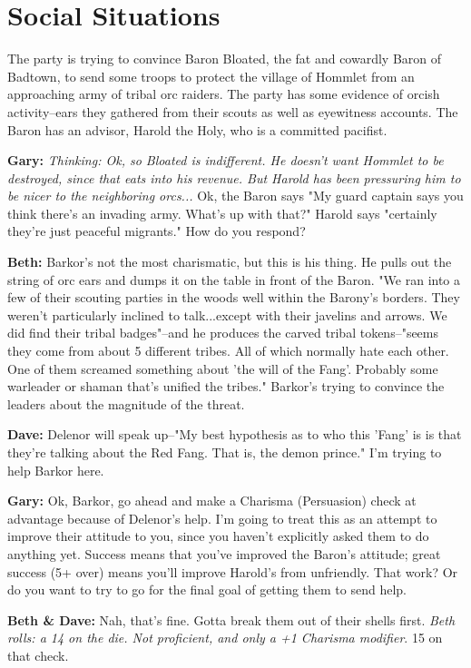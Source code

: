 \section{Social Situations}\label{example:social-situations}
The party is trying to convince Baron Bloated, the fat and cowardly Baron of Badtown, to send some troops to protect the village of Hommlet from an approaching army of tribal orc raiders. The party has some evidence of orcish activity--ears they gathered from their scouts as well as eyewitness accounts. The Baron has an advisor, Harold the Holy, who is a committed pacifist.

\textbf{Gary:} \textit{Thinking: Ok, so Bloated is indifferent. He doesn't want Hommlet to be destroyed, since that eats into his revenue. But Harold has been pressuring him to be nicer to the neighboring orcs...} Ok, the Baron says "My guard captain says you think there's an invading army. What's up with that?" Harold says "certainly they're just peaceful migrants." How do you respond?

\textbf{Beth:} Barkor's not the most charismatic, but this is his thing. He pulls out the string of orc ears and dumps it on the table in front of the Baron. "We ran into a few of their scouting parties in the woods well within the Barony's borders. They weren't particularly inclined to talk...except with their javelins and arrows. We did find their tribal badges"--and he produces the carved tribal tokens--"seems they come from about 5 different tribes. All of which normally hate each other. One of them screamed something about 'the will of the Fang'. Probably some warleader or shaman that's unified the tribes." Barkor's trying to convince the leaders about the magnitude of the threat.

\textbf{Dave:} Delenor will speak up--"My best hypothesis as to who this 'Fang' is is that they're talking about the Red Fang. That is, the demon prince." I'm trying to help Barkor here.

\textbf{Gary:} Ok, Barkor, go ahead and make a Charisma (Persuasion) check at advantage because of Delenor's help. I'm going to treat this as an attempt to improve their attitude to you, since you haven't explicitly asked them to do anything yet. Success means that you've improved the Baron's attitude; great success (5+ over) means you'll improve Harold's from unfriendly. That work? Or do you want to try to go for the final goal of getting them to send help.

\textbf{Beth & Dave:} Nah, that's fine. Gotta break them out of their shells first. \textit{Beth rolls: a 14 on the die. Not proficient, and only a +1 Charisma modifier}. 15 on that check.

